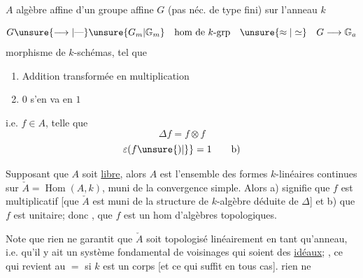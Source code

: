
$A$ algèbre affine d'un groupe affine $G$ (pas néc. de type fini) sur l'anneau $k$

\[G\unsure{\longrightarrow|\text{---}}\unsure{G_m|\mathbb G_m}\quad\text{hom de $k$-grp}\quad\unsure{\approx|\simeq}\quad G\longrightarrow\mathbb G_a\]
morphisme de $k$-schémas, tel que
\begin{enumerate}[label=(\roman*)]
\item Addition transformée en multiplication
\item $0$ s'en va en $1$
\end{enumerate}

i.e. $f\in A$, telle que
\[\Delta f=f\otimes f\tag*{a)}\]
\[\varepsilon(f\unsure{)|\}}=1\tag*{b)}\]

Supposant que $A$ soit \uline{libre}, alors $A$ est l'ensemble des formes $k$-linéaires continues sur $\check A=\operatorname{Hom}(A,k)$, muni de la convergence simple. Alors a) signifie que $f$ est multiplicatif  [que $\check A$ est muni de la structure de $k$-algèbre déduite de $\Delta$] et b) que $f$ est unitaire; donc , que $f$ est un hom d'algèbres topologiques.

 Note que rien ne garantit que $\check A$ soit topologisé linéairement en tant qu'anneau, i.e. qu'il y ait un système fondamental de voisinages qui soient des \uline{idéaux}; , ce qui revient au $=$ si $k$ est un corps [et ce qui suffit en tous cas]. rien ne
